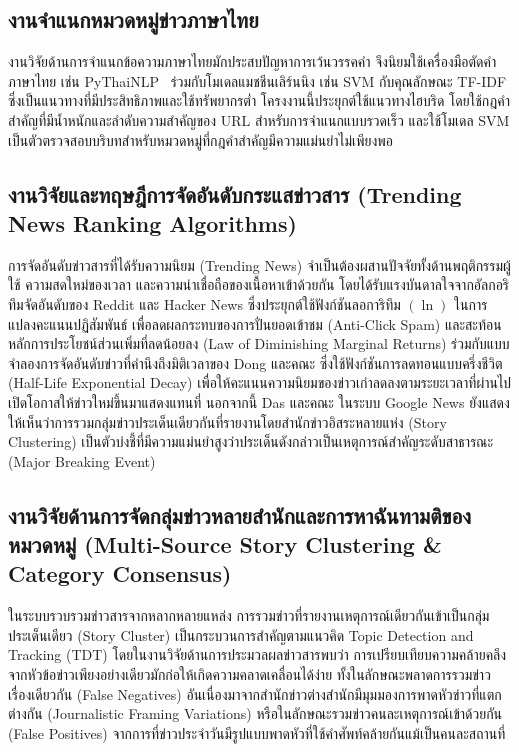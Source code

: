 \subsection{งานจำแนกหมวดหมู่ข่าวภาษาไทย}

งานวิจัยด้านการจำแนกข้อความภาษาไทยมักประสบปัญหาการเว้นวรรคคำ จึงนิยมใช้เครื่องมือตัดคำภาษาไทย เช่น PyThaiNLP~\parencite{pythainlp2021} ร่วมกับโมเดลแมชชีนเลิร์นนิง เช่น SVM กับคุณลักษณะ TF-IDF ซึ่งเป็นแนวทางที่มีประสิทธิภาพและใช้ทรัพยากรต่ำ โครงงานนี้ประยุกต์ใช้แนวทางไฮบริด โดยใช้กฎคำสำคัญที่มีน้ำหนักและลำดับความสำคัญของ URL สำหรับการจำแนกแบบรวดเร็ว และใช้โมเดล SVM เป็นตัวตรวจสอบบริบทสำหรับหมวดหมู่ที่กฎคำสำคัญมีความแม่นยำไม่เพียงพอ

\subsection{งานวิจัยและทฤษฎีการจัดอันดับกระแสข่าวสาร (Trending News Ranking Algorithms)}

การจัดอันดับข่าวสารที่ได้รับความนิยม (Trending News) จำเป็นต้องผสานปัจจัยทั้งด้านพฤติกรรมผู้ใช้ ความสดใหม่ของเวลา และความน่าเชื่อถือของเนื้อหาเข้าด้วยกัน โดยได้รับแรงบันดาลใจจากอัลกอริทึมจัดอันดับของ Reddit \parencite{salihefendic2015, swartz2005} และ Hacker News \parencite{graham2009} ซึ่งประยุกต์ใช้ฟังก์ชันลอการิทึม $(\ln)$ ในการแปลงคะแนนปฏิสัมพันธ์ เพื่อลดผลกระทบของการปั่นยอดเข้าชม (Anti-Click Spam) และสะท้อนหลักการประโยชน์ส่วนเพิ่มที่ลดน้อยลง (Law of Diminishing Marginal Returns) ร่วมกับแบบจำลองการจัดอันดับข่าวที่คำนึงถึงมิติเวลาของ Dong และคณะ \parencite{dong2010} ซึ่งใช้ฟังก์ชันการลดทอนแบบครึ่งชีวิต (Half-Life Exponential Decay) เพื่อให้คะแนนความนิยมของข่าวเก่าลดลงตามระยะเวลาที่ผ่านไป เปิดโอกาสให้ข่าวใหม่ขึ้นมาแสดงแทนที่ นอกจากนี้ Das และคณะ \parencite{das2007} ในระบบ Google News ยังแสดงให้เห็นว่าการรวมกลุ่มข่าวประเด็นเดียวกันที่รายงานโดยสำนักข่าวอิสระหลายแห่ง (Story Clustering) เป็นตัวบ่งชี้ที่มีความแม่นยำสูงว่าประเด็นดังกล่าวเป็นเหตุการณ์สำคัญระดับสาธารณะ (Major Breaking Event)

\subsection{งานวิจัยด้านการจัดกลุ่มข่าวหลายสำนักและการหาฉันทามติของหมวดหมู่ (Multi-Source Story Clustering \& Category Consensus)}

ในระบบรวบรวมข่าวสารจากหลากหลายแหล่ง การรวมข่าวที่รายงานเหตุการณ์เดียวกันเข้าเป็นกลุ่มประเด็นเดียว (Story Cluster) เป็นกระบวนการสำคัญตามแนวคิด Topic Detection and Tracking (TDT) โดยในงานวิจัยด้านการประมวลผลข่าวสารพบว่า การเปรียบเทียบความคล้ายคลึงจากหัวข้อข่าวเพียงอย่างเดียวมักก่อให้เกิดความคลาดเคลื่อนได้ง่าย ทั้งในลักษณะพลาดการรวมข่าวเรื่องเดียวกัน (False Negatives) อันเนื่องมาจากสำนักข่าวต่างสำนักมีมุมมองการพาดหัวข่าวที่แตกต่างกัน (Journalistic Framing Variations) หรือในลักษณะรวมข่าวคนละเหตุการณ์เข้าด้วยกัน (False Positives) จากการที่ข่าวประจำวันมีรูปแบบพาดหัวที่ใช้คำศัพท์คล้ายกันแม้เป็นคนละสถานที่

